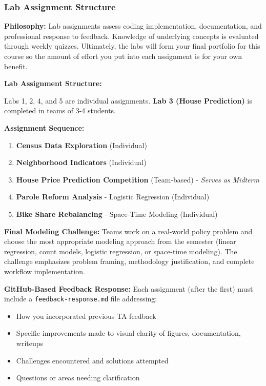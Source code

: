 \documentclass[
  11pt,
]{article}
\providecommand{\tightlist}{%
  \setlength{\itemsep}{0pt}\setlength{\parskip}{0pt}}
\begin{document}
\subsubsection{Lab Assignment Structure}\label{lab-assignment-structure}

\textbf{Philosophy:} Lab assignments assess coding implementation,
documentation, and professional response to feedback. Knowledge of
underlying concepts is evaluated through weekly quizzes. Ultimately, the
labs will form your final portfolio for this course so the amount of
effort you put into each assignment is for your own benefit.

\textbf{Lab Assignment Structure:}

Labs 1, 2, 4, and 5 are individual assignments. \textbf{Lab 3 (House
Prediction)} is completed in teams of 3-4 students.

\textbf{Assignment Sequence:}

\begin{enumerate}
\def\labelenumi{\arabic{enumi}.}
\tightlist
\item
  \textbf{Census Data Exploration} (Individual)
\item
  \textbf{Neighborhood Indicators} (Individual)
\item
  \textbf{House Price Prediction Competition} (Team-based) -
  \emph{Serves as Midterm}
\item
  \textbf{Parole Reform Analysis} - Logistic Regression (Individual)
\item
  \textbf{Bike Share Rebalancing} - Space-Time Modeling (Individual)
\end{enumerate}

\textbf{Final Modeling Challenge:} Teams work on a real-world policy
problem and choose the most appropriate modeling approach from the
semester (linear regression, count models, logistic regression, or
space-time modeling). The challenge emphasizes problem framing,
methodology justification, and complete workflow implementation.

\textbf{GitHub-Based Feedback Response:} Each assignment (after the
first) must include a \texttt{feedback-response.md} file addressing:

\begin{itemize}
\tightlist
\item
  How you incorporated previous TA feedback
\item
  Specific improvements made to visual clarity of figures,
  documentation, writeups
\item
  Challenges encountered and solutions attempted
\item
  Questions or areas needing clarification
\end{itemize}
\end{document}
